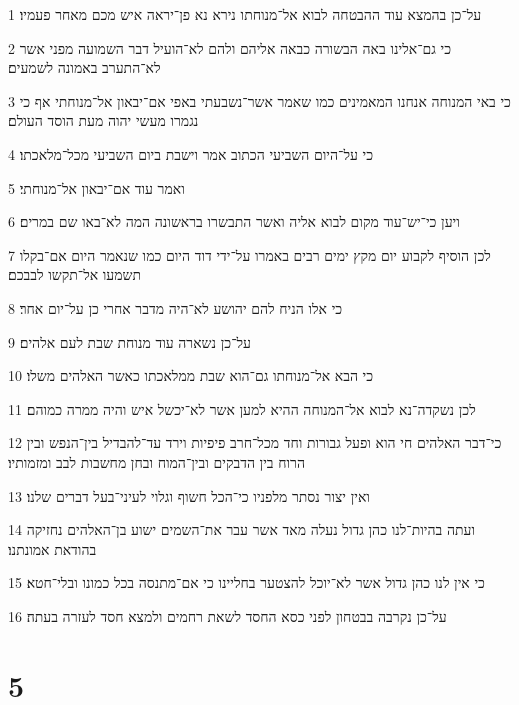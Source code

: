 \par 1 על־כן בהמצא עוד ההבטחה לבוא אל־מנוחתו נירא נא פן־יראה איש מכם מאחר פעמיו׃
\par 2 כי גם־אלינו באה הבשורה כבאה אליהם ולהם לא־הועיל דבר השמועה מפני אשר לא־התערב באמונה לשמעים׃
\par 3 כי באי המנוחה אנחנו המאמינים כמו שאמר אשר־נשבעתי באפי אם־יבאון אל־מנוחתי אף כי נגמרו מעשי יהוה מעת הוסד העולם׃
\par 4 כי על־היום השביעי הכתוב אמר וישבת ביום השביעי מכל־מלאכתו׃
\par 5 ואמר עוד אם־יבאון אל־מנוחתי׃
\par 6 ויען כי־יש־עוד מקום לבוא אליה ואשר התבשרו בראשונה המה לא־באו שם במרים׃
\par 7 לכן הוסיף לקבוע יום מקץ ימים רבים באמרו על־ידי דוד היום כמו שנאמר היום אם־בקלו תשמעו אל־תקשו לבבכם׃
\par 8 כי אלו הניח להם יהושע לא־היה מדבר אחרי כן על־יום אחר׃
\par 9 על־כן נשארה עוד מנוחת שבת לעם אלהים׃
\par 10 כי הבא אל־מנוחתו גם־הוא שבת ממלאכתו כאשר האלהים משלו׃
\par 11 לכן נשקדה־נא לבוא אל־המנוחה ההיא למען אשר לא־יכשל איש והיה ממרה כמוהם׃
\par 12 כי־דבר האלהים חי הוא ופעל גבורות וחד מכל־חרב פיפיות וירד עד־להבדיל בין־הנפש ובין הרוח בין הדבקים ובין־המוח ובחן מחשבות לבב ומזמותיו׃
\par 13 ואין יצור נסתר מלפניו כי־הכל חשוף וגלוי לעיני־בעל דברים שלנו׃
\par 14 ועתה בהיות־לנו כהן גדול נעלה מאד אשר עבר את־השמים ישוע בן־האלהים נחזיקה בהודאת אמונתנו׃
\par 15 כי אין לנו כהן גדול אשר לא־יוכל להצטער בחליינו כי אם־מתנסה בכל כמונו ובלי־חטא׃
\par 16 על־כן נקרבה בבטחון לפני כסא החסד לשאת רחמים ולמצא חסד לעזרה בעתה׃

\chapter{5}

